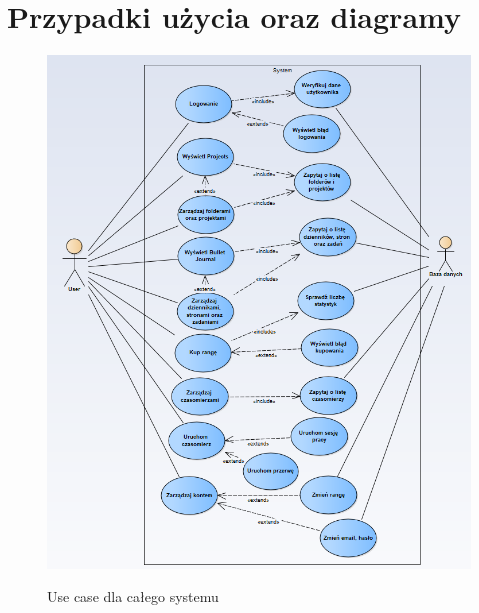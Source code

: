 \documentclass[a4paper,11pt]{report}
\begin{document}
\section{Przypadki użycia oraz diagramy}
\begin{figure}[H]
	\centering
	\includegraphics[scale=0.6]{systemusecase}\\
	\caption{Use case dla całego systemu}
	\label{fig:usecase}
\end{figure}
\end{document}
